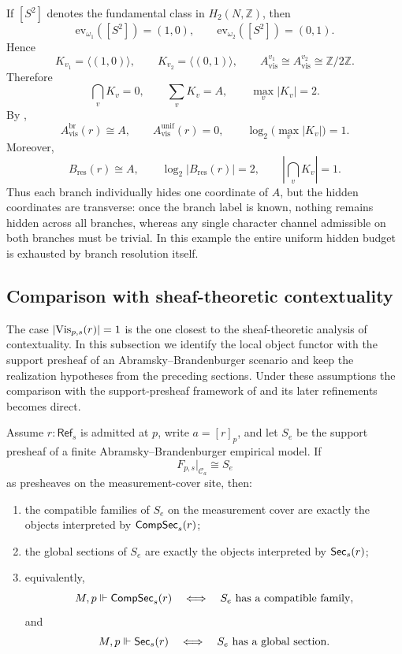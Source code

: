 \begin{example}
If $[S^2]$ denotes the fundamental class in $H_2(N,\mathbb Z)$, then
\[
\mathrm{ev}_{\omega_1}([S^2])=(1,0),
\qquad
\mathrm{ev}_{\omega_2}([S^2])=(0,1).
\]
Hence
\[
K_{v_1}=\langle(1,0)\rangle,
\qquad
K_{v_2}=\langle(0,1)\rangle,
\qquad
A_{\mathrm{vis}}^{v_1}\cong A_{\mathrm{vis}}^{v_2}\cong \mathbb Z/2\mathbb Z.
\]
Therefore
\[
\bigcap_{v} K_v=0,
\qquad
\sum_{v} K_v=A,
\qquad
\max_v |K_v|=2.
\]
By ,
\[
A_{\mathrm{vis}}^{\mathrm{br}}(r)\cong A,
\qquad
A_{\mathrm{vis}}^{\mathrm{unif}}(r)=0,
\qquad
\log_2\!\bigl(\max_v |K_v|\bigr)=1.
\]
Moreover,
\[
B_{\mathrm{res}}(r)\cong A,
\qquad
\log_2|B_{\mathrm{res}}(r)|=2,
\qquad
\left|\bigcap_v K_v\right|=1.
\]
Thus each branch individually hides one coordinate of $A$, but the hidden coordinates are transverse: once the branch label is known, nothing remains hidden across all branches, whereas any single character channel admissible on both branches must be trivial. In this example the entire uniform hidden budget is exhausted by branch resolution itself.
\end{example}

\subsection{Comparison with sheaf-theoretic contextuality}

The case $|\mathrm{Vis}_{p,s}(r)|=1$ is the one closest to the sheaf-theoretic analysis of contextuality. In this subsection we identify the local object functor with the support presheaf of an Abramsky--Brandenburger scenario and keep the realization hypotheses from the preceding sections. Under these assumptions the comparison with the support-presheaf framework of \cite{AbramskyBrandenburger2011} and its later refinements \cite{AbramskyMansfieldSoaresBarbosa2012,AbramskyBarbosaKishidaLalMansfield2015,Caru2017,Caru2018,Montanhano2021} becomes direct.
\begin{proposition}\label{prop:ab-compatibility-translation}
Assume $r:\mathsf{Ref}_s$ is admitted at $p$, write $a=[r]_p$, and let $S_e$ be the support presheaf of a finite Abramsky--Brandenburger empirical model. If
\[
F_{p,s}|_{\mathcal C_a}\cong S_e
\]
as presheaves on the measurement-cover site, then:
\begin{enumerate}[label=(\roman*),nosep]
\item the compatible families of $S_e$ on the measurement cover are exactly the objects interpreted by $\mathsf{CompSec}_s(r)$;
\item the global sections of $S_e$ are exactly the objects interpreted by $\mathsf{Sec}_s(r)$;
\item equivalently,
\[
M,p\Vdash \mathsf{CompSec}_s(r)
\quad\Longleftrightarrow\quad
S_e\ \text{has a compatible family},
\]
and
\[
M,p\Vdash \mathsf{Sec}_s(r)
\quad\Longleftrightarrow\quad
S_e\ \text{has a global section}.
\]
\end{enumerate}
\end{proposition}

